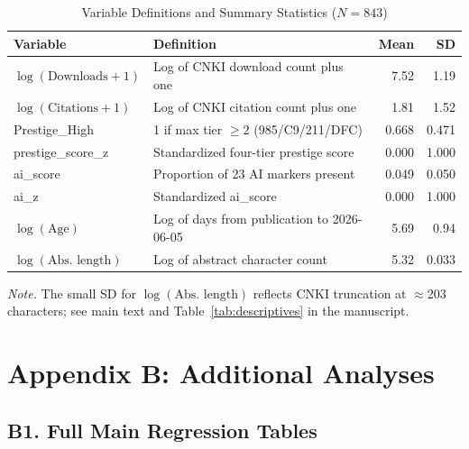 \documentclass[12pt,a4paper]{article}
\begin{document}
\begin{table}[htbp]
\centering
\caption{Variable Definitions and Summary Statistics ($N = 843$)}
\label{tab:vardict}
\begin{threeparttable}
\small
\begin{tabular}{lp{5.5cm}rr}
\toprule
Variable & Definition & Mean & SD \\
\midrule
$\log(\text{Downloads}+1)$ & Log of CNKI download count plus one & 7.52 & 1.19 \\
$\log(\text{Citations}+1)$ & Log of CNKI citation count plus one & 1.81 & 1.52 \\
Prestige\_High & 1 if max tier $\geq 2$ (985/C9/211/DFC) & 0.668 & 0.471 \\
prestige\_score\_z & Standardized four-tier prestige score & 0.000 & 1.000 \\
ai\_score & Proportion of 23 AI markers present & 0.049 & 0.050 \\
ai\_z & Standardized ai\_score & 0.000 & 1.000 \\
$\log(\text{Age})$ & Log of days from publication to 2026-06-05 & 5.69 & 0.94 \\
$\log(\text{Abs.\ length})$ & Log of abstract character count & 5.32 & 0.033 \\
\bottomrule
\end{tabular}
\begin{tablenotes}
\footnotesize
\item \textit{Note.} The small SD for $\log(\text{Abs.\ length})$ reflects
  CNKI truncation at $\approx$203 characters; see main text and
  Table~\ref{tab:descriptives} in the manuscript.
\end{tablenotes}
\end{threeparttable}
\end{table}

\newpage
\section*{Appendix B: Additional Analyses}

\subsection*{B1. Full Main Regression Tables}
\end{document}
